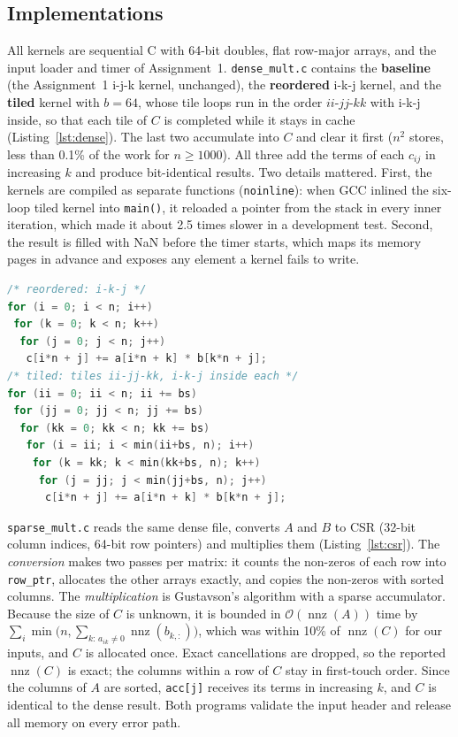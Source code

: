 \documentclass[conference,a4paper]{IEEEtran}
\newcommand{\bigO}[1]{\mathcal{O}\!\left(#1\right)}
\newcommand{\code}[1]{\texttt{#1}}
\newcommand{\nnz}{\operatorname{nnz}}
\begin{document}
\subsection{Implementations}
\label{sec:impl}
All kernels are sequential C with 64-bit doubles, flat row-major arrays, and
the input loader and timer of Assignment~1. \code{dense\_mult.c} contains the
\textbf{baseline} (the Assignment~1 i-j-k kernel, unchanged), the
\textbf{reordered} i-k-j kernel, and the \textbf{tiled} kernel with $b = 64$,
whose tile loops run in the order $ii$-$jj$-$kk$ with i-k-j inside, so that each
tile of $C$ is completed while it stays in cache (Listing~\ref{lst:dense}).
The last two accumulate into $C$ and clear it first ($n^2$ stores, less than
0.1\% of the work for $n \ge 1000$). All three add the terms of each $c_{ij}$
in increasing $k$ and produce bit-identical results. Two details mattered.
First, the kernels are compiled as separate functions (\code{noinline}): when
GCC inlined the six-loop tiled kernel into \code{main()}, it reloaded a pointer
from the stack in every inner iteration, which made it about 2.5 times slower
in a development test. Second, the result is filled with NaN before the timer
starts, which maps its memory pages in advance and exposes any element a kernel
fails to write.

\begin{lstlisting}[language=C, float=t, caption={Reordered and tiled kernels (simplified). Both start from $C = 0$.}, label=lst:dense, captionpos=b]
/* reordered: i-k-j */
for (i = 0; i < n; i++)
 for (k = 0; k < n; k++)
  for (j = 0; j < n; j++)
   c[i*n + j] += a[i*n + k] * b[k*n + j];
/* tiled: tiles ii-jj-kk, i-k-j inside each */
for (ii = 0; ii < n; ii += bs)
 for (jj = 0; jj < n; jj += bs)
  for (kk = 0; kk < n; kk += bs)
   for (i = ii; i < min(ii+bs, n); i++)
    for (k = kk; k < min(kk+bs, n); k++)
     for (j = jj; j < min(jj+bs, n); j++)
      c[i*n + j] += a[i*n + k] * b[k*n + j];
\end{lstlisting}

\code{sparse\_mult.c} reads the same dense file, converts $A$ and $B$ to CSR
(32-bit column indices, 64-bit row pointers) and multiplies them
(Listing~\ref{lst:csr}). The \emph{conversion} makes two passes per matrix: it
counts the non-zeros of each row into \code{row\_ptr}, allocates the other
arrays exactly, and copies the non-zeros with sorted columns. The
\emph{multiplication} is Gustavson's algorithm with a sparse accumulator.
Because the size of $C$ is unknown, it is bounded in $\bigO{\nnz(A)}$ time by
$\sum_i \min\bigl(n, \sum_{k:\,a_{ik}\neq 0} \nnz(b_{k,:})\bigr)$, which was
within 10\% of $\nnz(C)$ for our inputs, and $C$ is allocated once. Exact
cancellations are dropped, so the reported $\nnz(C)$ is exact; the columns
within a row of $C$ stay in first-touch order. Since the columns of $A$ are
sorted, \code{acc[j]} receives its terms in increasing $k$, and $C$ is
identical to the dense result. Both programs validate the input header and
release all memory on every error path.
\end{document}
